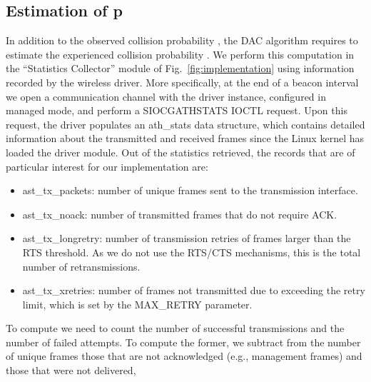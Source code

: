 \documentclass[a4paper,10pt]{article}
\begin{document}
\subsection{Estimation of p}
\label{sec:pown}

In addition to the observed collision probability , the DAC algorithm requires to estimate the experienced collision probability . We perform this computation in the ``Statistics Collector'' module of Fig.~\ref{fig:implementation} using information recorded by the wireless driver. More specifically, at the end of a beacon interval we open a communication channel with the driver instance, configured in {\ttfamily managed} mode, and perform a {\ttfamily SIOCGATHSTATS IOCTL} request. Upon this request, the driver populates an {\ttfamily ath\_stats} data structure, which contains detailed information about the transmitted and received frames since the Linux kernel has loaded the driver module. Out of the statistics retrieved, the records that are of particular interest for our implementation are: 
\begin{itemize}
  \item {\ttfamily ast\_tx\_packets}: number of unique frames sent to the transmission interface.
  \item {\ttfamily ast\_tx\_noack}: number of transmitted frames that do not require ACK.
  \item {\ttfamily ast\_tx\_longretry}: number of transmission retries of frames larger than the RTS threshold. As we do not use the RTS/CTS mechanisms, this is the total number of retransmissions.
  \item {\ttfamily ast\_tx\_xretries}: number of frames not transmitted due to exceeding the retry limit, which is set by the {\ttfamily MAX\_RETRY} parameter.
\end{itemize}

To compute  we need to count the number of successful transmissions and the number of failed attempts. To compute the former, we subtract from the number of unique frames those that are not acknowledged (e.g., management frames) and those that were not delivered,
\end{document}
